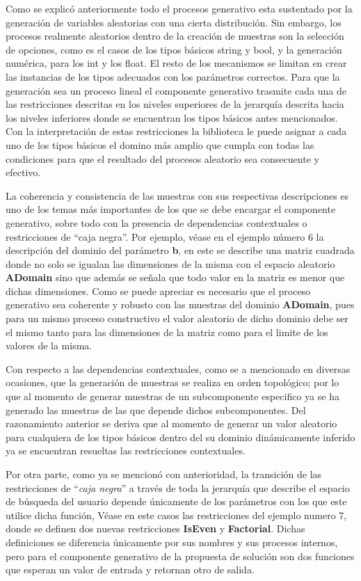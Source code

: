 Como se explicó anteriormente todo el procesos generativo esta sustentado por la generación de variables aleatorias
con una cierta distribución. Sin embargo, los procesos realmente aleatorios dentro de la creación de muestras son la
selección de opciones, como es el casos de los tipos básicos string y bool, y la generación numérica, para los int y los
float. El resto de los mecanismos se limitan en crear las instancias de los tipos adecuados con los parámetros correctos. Para que
la generación sea un proceso lineal el componente generativo trasmite cada una de las restricciones descritas en los niveles
superiores de la jerarquía descrita hacia los niveles inferiores donde se encuentran los tipos básicos antes mencionados.
Con la interpretación de estas restricciones la biblioteca le puede asignar a cada uno de los tipos básicos el domino más
amplio que cumpla con todas las condiciones para que el resultado del procesos aleatorio sea consecuente y efectivo.

La coherencia y consistencia de las muestras con sus respectivas descripciones es uno de los temas más importantes de los que
se debe encargar el componente generativo, sobre todo con la presencia de dependencias contextuales o restricciones de
“caja negra”. Por ejemplo, véase en el ejemplo número 6 la descripción del dominio del parámetro {\bf b}, en este se describe una matriz cuadrada
donde no solo se igualan las dimensiones de la misma con el espacio aleatorio {\bf ADomain} sino que además se señala que todo
valor en la matriz es menor que dichas dimensiones. Como se puede apreciar es necesario que el proceso generativo sea coherente
y robusto con las muestras del dominio {\bf ADomain}, pues para un mismo proceso constructivo el valor aleatorio de dicho dominio
debe ser el mismo tanto para las dimensiones de la matriz como para el limite de los valores de la misma.

Con respecto a las dependencias contextuales, como se a mencionado en diversas ocasiones, que la generación de muestras se realiza
en orden topológico; por lo que al momento de generar muestras de un subcomponente especifico ya se ha
generado las muestras de las que depende dichos subcomponentes. Del razonamiento anterior se deriva que al momento de generar
un valor aleatorio para cualquiera de los tipos básicos dentro del su dominio dinámicamente inferido ya se encuentran resueltas
las restricciones contextuales.

Por otra parte, como ya se mencionó con anterioridad, la transición de las restricciones de “{\it caja negra}” a través de
toda la jerarquía que describe el espacio de búsqueda del usuario depende únicamente de los parámetros con los que
este utilice dicha función, Véase en este casos las restricciones del ejemplo numero 7, donde se definen dos nuevas
restricciones {\bf IsEven} y {\bf Factorial}. Dichas definiciones se diferencia únicamente por sus nombres y sus procesos internos,
pero para el componente generativo de la propuesta de solución son dos funciones que esperan un valor de entrada y
retornan otro de salida.

